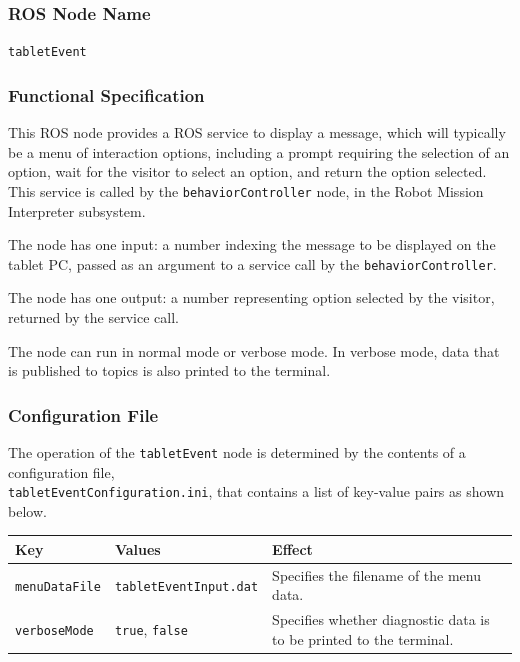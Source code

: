 \documentclass{CSSRforAfrica}
\begin{document}
{{\subsubsection*{ROS Node Name}
 {\small \verb+tabletEvent+}   

\subsubsection*{Functional Specification}
This ROS node provides a ROS service to display a message, which will typically be a menu of interaction options, including a prompt requiring the selection of an option,  wait for the visitor to select an option, and return the option selected. This service is called by the {\small \verb+behaviorController+} node, in the Robot Mission Interpreter  subsystem.   

The node has one input: a number indexing the message to be displayed on the tablet PC, passed as an argument to a service call by the {\small \verb+behaviorController+}.
 
The node has one output: a number representing option selected by the visitor, returned  by the service call.

The node can run in normal mode or verbose mode. In verbose mode, data that is published to topics is also printed to the terminal.

\subsubsection*{Configuration File}

The operation of the {\small \verb+tabletEvent+} node is determined by the contents of a configuration file, \\
{\small \verb+tabletEventConfiguration.ini+}, that contains a list of key-value pairs as shown below.

 
\begin{center}
\begin{tabularx}{\linewidth}{| l | l | X|}
\hline 
{\small Key }                               & {\small Values }                                                 &  {\small Effect}       \\
\hline
{\footnotesize \verb+menuDataFile+}  & {\footnotesize \verb+tabletEventInput.dat+}   &  {\small Specifies the filename of the menu data.} \\ 
\hline
{\footnotesize \verb+verboseMode+}  & {\footnotesize \verb+true+, \verb+false+}     & {\small Specifies whether diagnostic data is to be printed to the terminal.} \\
\hline
\end{tabularx}
\end{center}
 



}}
\end{document}
